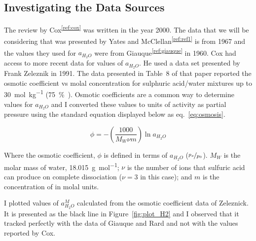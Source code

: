 \documentclass[]{tufte-handout}
\newcommand{\tss}[1]{\textsuperscript{#1}}
\begin{document}
\subsection{Investigating the Data Sources}
The review by Cox\tss{\ref{ref:cox}} was written in the year 2000. The data that we will be considering that was presented by Yates and McClellan\tss{\ref{ref:ref1}} is from 1967 and the values they used for $a_{H_2O}$ were from Giauque\tss{\ref{ref:giauque}} in 1960. Cox had access to more recent data for values of $a_{H_2O}$. He used a data set presented by Frank Zeleznik in 1991. The data presented in Table~8 of that paper reported the osmotic coefficient vs molal concentration for sulphuric acid/water mixtures up to \qty{30}{\mole\per\kilo\gram} (\qty{75}{\percent{}}). Osmotic coefficients are a common way to determine values for $a_{H_2O}$ and I converted these values to units of activity as partial pressure using the standard equation displayed below as eq.~\ref{eq:osmosis}.  

\begin{equation}\phi = -\left(\frac{1000}{M_W \nu m}\right)\ln{a_{H_2O}}\label{eq:osmosis}\end{equation}


Where the osmotic coefficient, $\phi$ is defined in terms of $a_{H_2O}$ ($\nicefrac{p_x}{p_0}$). $M_W$ is the molar mass of water, \qty{18.015}{\gram\per\mole}; $\nu$ is the number of ions that sulfuric acid can produce on complete dissociation ($\nu = 3$ in this case); and $m$ is the concentration of  in molal units.

I plotted values of $a_{H_2O}^M$ calculated from the osmotic coefficient data of Zeleznick. It is presented as the black line in Figure~\vref{fig:plot_H2} and I observed that it tracked perfectly with the data of Giauque and Rard and not with the values reported by Cox. 
\end{document}
